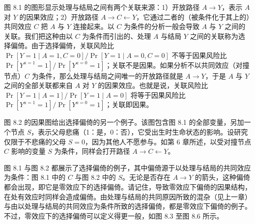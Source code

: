 图 8.1 的图形显示处理与结局之间有两个关联来源：1）开放路径 $A\to Y$，表示 $A$ 对 $Y$ 的因果效应；2）开放路径 $A\to C\leftarrow Y$，它通过二者的（被条件化于其上的）共同效应 $C$ 把 $A$ 与 $Y$ 连接起来。以 $C$ 为条件的分析一般会导致 $A$ 与 $Y$ 之间的关联。我们把这种由以 $C$ 为条件而引出的、处理 $A$ 与结局 $Y$ 之间的关联称为选择偏倚。由于选择偏倚，关联风险比 $\Pr[Y=1\mid A=1,C=0]/\Pr[Y=1\mid A=0,C=0]$ 不等于因果风险比 $\Pr[Y^{a=1}=1]/\Pr[Y^{a=0}=1]$；关联不是因果。如果分析不以共同效应（对撞节点）$C$ 为条件，那么处理与结局之间唯一的开放路径就是 $A\to Y$，于是 $A$ 与 $Y$ 之间的全部关联都来自 $A$ 对 $Y$ 的因果效应。也就是说，关联风险比 $\Pr[Y=1\mid A=1]/\Pr[Y=1\mid A=0]$ 将等于因果风险比 $\Pr[Y^{a=1}=1]/\Pr[Y^{a=0}=1]$；关联即因果。

\begin{figure}[htbp]
\centering
{}
\caption{}
\label{fig:8.2}
\end{figure}

图 8.2 的因果图给出选择偏倚的另一个例子。该图包含图 8.1 的全部变量，另加一个节点 $S$，表示父母悲痛（1：是，0：否），它受出生时生命状态的影响。设研究仅限于不悲痛的父母 $S=0$，因为其他人不愿参与。如第 6 章所述，以受对撞节点 $C$ 影响的变量 $S$ 为条件，同样会打开路径 $A\to C\leftarrow Y$。

图 8.1 与图 8.2 都展示了选择偏倚的例子，其中偏倚源于以处理与结局的共同效应为条件：图 8.1 中的 $C$ 与图 8.2 中的 $S$。无论是否存在 $A\to Y$ 的箭头，这种偏倚都会出现，即它是零效应下的选择偏倚。请记住，导致零效应下偏倚的因果结构，在处有效应时同样会造成偏倚。由处理与结局的共同原因所致的混杂（见上一章）与由以处理与结局的共同效应为条件所致的选择偏倚，都是零效应下偏倚的例子。不过，零效应下的选择偏倚可以定义得更一般，如图 8.3 至图 8.6 所示。

\begin{figure}[htbp]
\centering
{}
\caption{}
\label{fig:8.3}
\end{figure}

